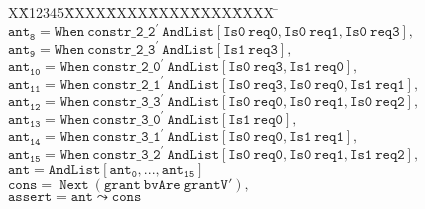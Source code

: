 \documentclass{article}
\newlength{\fminilength}
\newenvironment{fmini}[1][\linewidth]
  {\setlength{\fminilength}{#1\fboxsep-2\fboxrule}%
   \vspace{2ex}\noindent\begin{lrbox}{\fminibox}\begin{minipage}{\fminilength}%
   \mbox{ }\hfill\vspace{-2.5ex}}%
  {\end{minipage}\end{lrbox}\vspace{1ex}\hspace{0ex}%
   \framebox{\usebox{\fminibox}}}
\newenvironment{specification}
{\noindent\footnotesize\tt\begin{fmini}\begin{tabbing}X\=X12345\=XXXX\=XXXX\=XXXX\=XXXX\=XXXX
\=\+\kill} {\end{tabbing}\normalfont\end{fmini}}
\begin{document}
\begin{specification}
$\mathtt{ant_{8}=When\ constr\_2\_2}^{\prime }\mathtt{\ AndList[Is0\
req0,Is0\ req1,Is0\ req3],}$\\

$\mathtt{ant_{9}=When\ constr\_2\_3}^{\prime }\mathtt{\ AndList[Is1\ req3],}$%
\\

$\mathtt{ant_{10}=When\ constr\_2\_0}^{\prime }\mathtt{\
AndList[Is0\ req3,Is1\ req0],}$\\

$\mathtt{ant_{11}=When\ constr\_2\_1}^{\prime }\mathtt{\
AndList[Is0\ req3,Is0\ req0,Is1\ req1],}$\\

$\mathtt{ant_{12}=When\ constr\_3\_3}^{\prime }\mathtt{\
AndList[Is0\ req0,Is0\ req1,Is0\ req2],}$\\

$\mathtt{ant_{13}=When\ constr\_3\_0}^{\prime }\mathtt{\
AndList[Is1\ req0],} $\\

$\mathtt{ant_{14}=When\ constr\_3\_1}^{\prime }\mathtt{\
AndList[Is0\ req0,Is1\ req1],}$\\

$\mathtt{ant_{15}=When\ constr\_3\_2}^{\prime }\mathtt{\
AndList[Is0\ req0,Is0\ req1,Is1\ req2],}$\\

$\mathtt{ant=AndList [ant_{0},...,ant_{15}]}$\\

$\mathtt{cons=\ Next \ (grant\ bvAre\ grantV'),}$\\

$\mathtt{assert=ant\leadsto cons}$\\

\end{specification}
\end{document}
